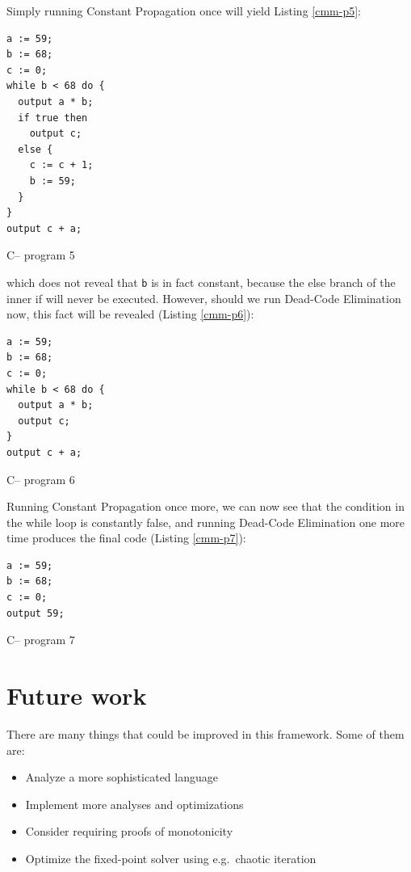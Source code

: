\documentclass{article}
\begin{document}
Simply running Constant Propagation once will yield Listing \ref{cmm-p5}:

\begin{listing}[H]
\begin{verbatim}
a := 59;
b := 68;
c := 0;
while b < 68 do {
  output a * b;
  if true then
    output c;
  else {
    c := c + 1;
    b := 59;
  }
}
output c + a;
\end{verbatim}
\caption{C-- program 5}
\label{cmm-p5}
\end{listing}

which does not reveal that \texttt{b} is in fact constant, because the
else branch of the inner if will never be executed. However, should we
run Dead-Code Elimination now, this fact will be revealed (Listing \ref{cmm-p6}):

\begin{listing}[H]
\begin{verbatim}
a := 59;
b := 68;
c := 0;
while b < 68 do {
  output a * b;
  output c;
}
output c + a;
\end{verbatim}
\caption{C-- program 6}
\label{cmm-p6}
\end{listing}

Running Constant Propagation once more, we can now see that the
condition in the while loop is constantly false, and running Dead-Code
Elimination one more time produces the final code (Listing \ref{cmm-p7}):

\begin{listing}[H]
\begin{verbatim}
a := 59;
b := 68;
c := 0;
output 59;
\end{verbatim}
\caption{C-- program 7}
\label{cmm-p7}
\end{listing}

\section{Future work}\label{future-work}

There are many things that could be improved in this framework. Some of
them are:

\begin{itemize}
\itemsep1pt\parskip0pt
\item
  Analyze a more sophisticated language
\item
  Implement more analyses and optimizations
\item
  Consider requiring proofs of monotonicity
\item
  Optimize the fixed-point solver using e.g.~chaotic iteration
\end{itemize}
\end{document}
